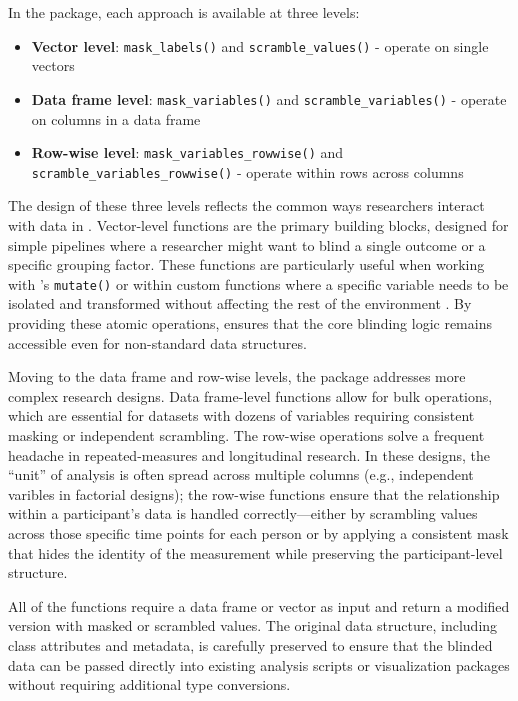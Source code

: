 In the  package, each approach is available at three levels:

\begin{itemize}
\tightlist
\item
  \textbf{Vector level}: \texttt{mask\_labels()} and \texttt{scramble\_values()} - operate on single vectors
\item
  \textbf{Data frame level}: \texttt{mask\_variables()} and \texttt{scramble\_variables()} - operate on columns in a data frame
\item
  \textbf{Row-wise level}: \texttt{mask\_variables\_rowwise()} and \texttt{scramble\_variables\_rowwise()} - operate within rows across columns
\end{itemize}

The design of these three levels reflects the common ways researchers interact with data in . Vector-level functions are the primary building blocks, designed for simple pipelines where a researcher might want to blind a single outcome or a specific grouping factor. These functions are particularly useful when working with 's \texttt{mutate()} or within custom functions where a specific variable needs to be isolated and transformed without affecting the rest of the environment \citep{Wickham2025-eh}. By providing these atomic operations,  ensures that the core blinding logic remains accessible even for non-standard data structures.

Moving to the data frame and row-wise levels, the package addresses more complex research designs. Data frame-level functions allow for bulk operations, which are essential for datasets with dozens of variables requiring consistent masking or independent scrambling. The row-wise operations solve a frequent headache in repeated-measures and longitudinal research. In these designs, the ``unit'' of analysis is often spread across multiple columns (e.g., independent varibles in factorial designs); the row-wise functions ensure that the relationship within a participant's data is handled correctly---either by scrambling values across those specific time points for each person or by applying a consistent mask that hides the identity of the measurement while preserving the participant-level structure.

All of the functions require a data frame or vector as input and return a modified version with masked or scrambled values. The original data structure, including class attributes and metadata, is carefully preserved to ensure that the blinded data can be passed directly into existing analysis scripts or visualization packages without requiring additional type conversions.

